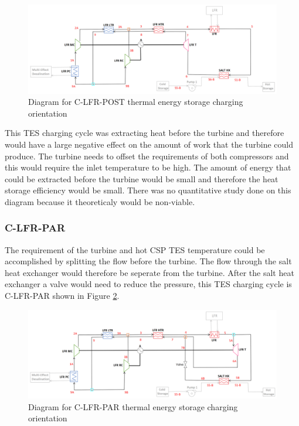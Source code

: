 \begin{figure}[H]
    \widefigure
    \includegraphics[width=\linewidth]{Definitions/c-lfr-post.pdf}
    \caption{Diagram for C-LFR-POST thermal energy storage charging orientation\label{c-lfr-post}}
\end{figure}
\begin{paracol}{2}
\linenumbers
\switchcolumn

This TES charging cycle was extracting heat before the turbine and therefore would have a large negative effect on the amount of work that the turbine could produce. The turbine needs to offset the requirements of both compressors and this would require the inlet temperature to be high. The amount of energy that could be extracted before the turbine would be small and therefore the heat storage efficiency would be small. There was no quantitative study done on this diagram because it theoreticaly would be non-viable. 

\subsubsection{C-LFR-PAR} %

The requirement of the turbine and hot CSP TES temperature could be accomplished by splitting the flow before the turbine. The flow through the salt heat exchanger would therefore be seperate from the turbine. After the salt heat exchanger a valve would need to reduce the pressure, this TES charging cycle is C-LFR-PAR shown in Figure \ref{c-lfr-par}.

\end{paracol}
\begin{figure}[H]
    \widefigure
    \includegraphics[width=\linewidth]{Definitions/c-lfr-par.pdf}
    \caption{Diagram for C-LFR-PAR thermal energy storage charging orientation\label{c-lfr-par}}
\end{figure}
